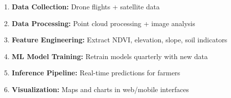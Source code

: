 \begin{enumerate}
    \item \textbf{Data Collection:} Drone flights + satellite data
    \item \textbf{Data Processing:} Point cloud processing + image analysis
    \item \textbf{Feature Engineering:} Extract NDVI, elevation, slope, soil indicators
    \item \textbf{ML Model Training:} Retrain models quarterly with new data
    \item \textbf{Inference Pipeline:} Real-time predictions for farmers
    \item \textbf{Visualization:} Maps and charts in web/mobile interfaces
\end{enumerate}

